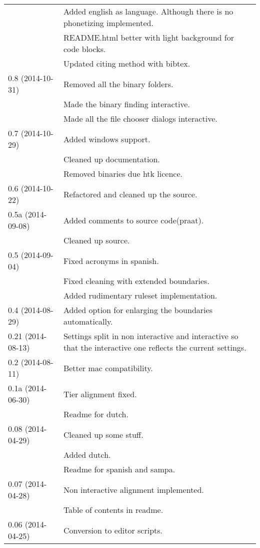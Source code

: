 \begin{longtable}{|p{0.22\linewidth}p{0.8\linewidth}|}
		& \tabitem Added english as language. Although there is no phonetizing
implemented.\\
		& \tabitem README.html better with light background for code blocks.\\
		& \tabitem Updated citing method with bibtex.\\
	\hline
	0.8 (2014-10-31) & \tabitem Removed all the binary folders.\\
		& \tabitem Made the binary finding interactive.\\
		& \tabitem Made all the file chooser dialogs interactive.\\
	\hline
	0.7 (2014-10-29) & \tabitem Added windows support.\\
		&	\tabitem Cleaned up documentation.\\
		& \tabitem Removed binaries due htk licence.\\
	\hline
	0.6 (2014-10-22) & \tabitem Refactored and cleaned up the source.\\
	\hline
	0.5a (2014-09-08) & \tabitem Added comments to source code(praat).\\
		& \tabitem Cleaned up source.\\
	\hline
	0.5 (2014-09-04) & \tabitem Fixed acronyms in spanish.\\
		& \tabitem Fixed cleaning with extended boundaries.\\
		& \tabitem Added rudimentary ruleset implementation.\\
	\hline
	0.4 (2014-08-29) & \tabitem Added option for enlarging the boundaries
automatically.\\
	\hline
	0.21 (2014-08-13) & \tabitem Settings split in non interactive and
interactive so that the interactive one reflects the current settings.\\
	\hline
	0.2 (2014-08-11) & \tabitem Better mac compatibility.\\
	\hline
	0.1a (2014-06-30) & \tabitem Tier alignment fixed.\\
		& \tabitem Readme for dutch.\\
	\hline
	0.08 (2014-04-29) & \tabitem Cleaned up some stuff.\\
		& \tabitem Added dutch.\\
		& \tabitem Readme for spanish and sampa.\\
	\hline
	0.07 (2014-04-28) & \tabitem Non interactive alignment implemented.\\
		& \tabitem Table of contents in readme.\\
	\hline
	0.06 (2014-04-25) & \tabitem Conversion to editor scripts.\\

\end{longtable}
